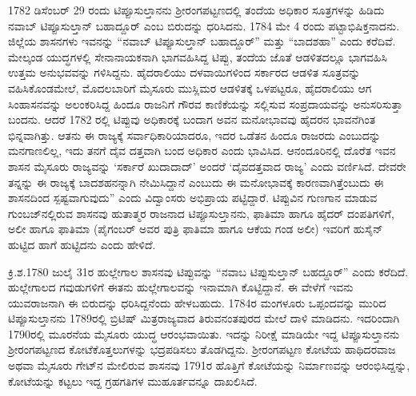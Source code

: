 1782 ಡಿಸೆಂಬರ್​ 29 ರಂದು ಟಿಪ್ಪೂಸುಲ್ತಾನನು ಶ‍್ರೀರಂಗಪಟ್ಟಣದಲ್ಲಿ ತಂದೆಯ ಅಧಿಕಾರ ಸೂತ್ರಗಳನ್ನು ಹಿಡಿದು ನವಾಬ್​ ಟಿಪ್ಪೂಸುಲ್ತಾನ್​ ಬಹಾದ್ದೂರ್​ ಎಂಬ ಬಿರುದನ್ನು ಧರಿಸಿದನು. 1784 ಮೇ 4 ರಂದು ಪಟ್ಟಾಭಿಷಿಕ್ತನಾದನು. ಜಿಲ್ಲೆಯ ಶಾಸನಗಳು ಇವನನ್ನು “ನವಾಬ್​ ಟಿಪ್ಪೂಸುಲ್ತಾನ್​ ಬಹಾದ್ದೂರ್​” ಮತ್ತು “ಬಾದಶಹಾ” ಎಂದು ಕರೆದಿವೆ. ಮೇಲ್ಕಂಡ ಯುದ್ಧಗಳಲ್ಲಿ ಸೇನಾನಾಯಕನಾಗಿ ಭಾಗವಹಿಸಿದ್ದ ಟಿಪ್ಪು, ತಂದೆಯ ಜೊತೆ ಆಡಳಿತದಲ್ಲೂ ಭಾಗವಹಿಸಿ ಉತ್ತಮ ಅನುಭವವನ್ನು ಗಳಿಸಿದ್ದನು. ಹೈದರಾಲಿಯು ದಳವಾಯಿಗಳಿಂದ ಸರ್ಕಾರದ ಆಡಳಿತ ಸೂತ್ರವನ್ನು ವಹಿಸಿಕೊಂಡಮೇಲೆ, ಮೊದಲಬಾರಿಗೆ ಮೈಸೂರು ಮುಸ್ಲಿಮರ ಆಡಳಿತಕ್ಕೆ ಒಳಪಟ್ಟರೂ, ಹೈದರಾಲಿಯು ಆಗ ಸಿಂಹಾಸನವನ್ನು ಅಲಂಕರಿಸಿದ್ದ ಹಿಂದೂ ರಾಜನಿಗೆ ಗೌರವ ಕಾಣಿಕೆಯನ್ನು ಸಲ್ಲಿಸುವ ಸಂಪ್ರದಾಯವನ್ನು ಅನುಸರಿಸುತ್ತಾ ಬಂದನು. ಆದರೆ 1782 ರಲ್ಲಿ ಟಿಪ್ಪುವು ಅಧಿಕಾರಕ್ಕೆ ಬಂದಾಗ ಅವನ ಮನೋಭಾವವು ಹೈದರನ ಭಾವನೆಗಿಂತ ಭಿನ್ನವಾಗಿತ್ತು. ಆತನು ಈ ರಾಜ್ಯಕ್ಕೆ ಸರ್ವಾಧಿಕಾರಿಯಾದರೂ, ಇದರ ಒಡೆತನ ಹಿಂದೂ ರಾಜರದು ಎಂಬುದನ್ನು ಮನಗಾಣಲಿಲ್ಲ, ಇದು ತನಗೆ ದೈವ ದತ್ತವಾಗಿ ಬಂದ ಅಧಿಕಾರ ಎಂದು ಭಾವಿಸಿದ. ಆನಂದೂರಿನಲ್ಲಿ ದೊರೆತ ಇವನ ಶಾಸನ ಮೈಸೂರು ರಾಜ್ಯವನ್ನು ‘ಸರ್ಕಾರೆ ಖುದಾದಾದ್​’ ಅಂದರೆ ‘ದೈವದತ್ತವಾದ ರಾಜ್ಯ’ ಎಂದು ವರ್ಣಿಸಿದೆ. ದೇವರೇ ತನ್ನನ್ನು ಈ ರಾಜ್ಯಕ್ಕೆ ಬಾದಶಹನನ್ನಾಗಿ ನೇಮಿಸಿದ್ದಾನೆ ಎಂಬುದು ಈ ಮನೋಭಾವಕ್ಕೆ ಕಾರಣವಾಗಿತ್ತೆಂಬುದು ಈ ಶಾಸನದಿಂದ ಸ್ಪಷ್ಟವಾಗುವುದು” ಎಂದು ವಿದ್ವಾಂಸರು ಅಭಿಪ್ರಾಯ ಪಟ್ಟಿದ್ದಾರೆ. ಟಿಪ್ಪುವಿನ ಗುಣಗಾನ ಮಾಡುವ ಗುಂಬಜ್​ನಲ್ಲಿರುವ ಶಾಸನವು ಹುತಾತ್ಮರ ರಾಜನಾದ ಟಿಪ್ಪೂಸುಲ್ತಾನನು, ಫಾತಿಮಾ ಹಾಗೂ ಹೈದರ್​ ದಂಪತಿಗಳಿಗೆ, ಅಲೀ ಹಾಗೂ ಫಾತಿಮಾ (ಪೈಗಂಬರ್​ ಅವರ ಪುತ್ರಿ ಫಾತಿಮಾ ಹಾಗೂ ಆಕೆಯ ಗಂಡ ಅಲೀ) ಇವರಿಗೆ ಹುಸೈನ್​ ಹುಟ್ಟಿದ ಹಾಗೆ ಹುಟ್ಟಿದನು ಎಂದು ಹೇಳಿದೆ.

ಕ್ರಿ.ಶ.1780 ಜುಲೈ 31ರ ಹುಲ್ಲೇಗಾಲ ಶಾಸನವು ಟಿಪ್ಪುವನ್ನು “ನವಾಬ ಟಿಪ್ಪುಸುಲ್ತಾನ್​ ಬಹದ್ದೂರ್​” ಎಂದು ಕರೆದಿದೆ. ಹುಲ್ಲೇಗಾಲದ ಗವುಡುಗಳಿಗೆ ಈತನು ಹುಲ್ಲೇಗಾಲವನ್ನು ಇನಾಮಾಗಿ ಕೊಟ್ಟಿದ್ದಾನೆ. ಈ ವೇಳೆಗೆ ಇವನು ಯುವರಾಜನಾಗಿ ಈ ಬಿರುದನ್ನು ಧರಿಸಿದ್ದನೆಂದು ಹೇಳಬಹುದು. 1784ರ ಮಂಗಳೂರು ಒಪ್ಪಂದವನ್ನು ಮುರಿದ ಟಿಪ್ಪೂಸುಲ್ತಾನನು 1789ರಲ್ಲಿ ಬ್ರಿಟಿಷ್​ ಮಿತ್ರರಾಜ್ಯವಾದ ತಿರುವನಂತಪುರದ ಮೇಲೆ ದಾಳಿ ಮಾಡಿದನು. ಇದರಿಂದಾಗಿ 1790ರಲ್ಲಿ ಮೂರನೆಯ ಮೈಸೂರು ಯುದ್ಧ ಆರಂಭವಾಯಿತು. ಇದನ್ನು ನಿರೀಕ್ಷೆ ಮಾಡಿಯೇ ಇದ್ದ ಟಿಪ್ಪೂಸುಲ್ತಾನನು ಶ‍್ರೀರಂಗಪಟ್ಟಣದ ಕೋಟೆಕೊತ್ತಲುಗಳನ್ನು ಭದ್ರಪಡಿಸಲು ತೊಡಗಿದ್ದನು. ಶ‍್ರೀರಂಗಪಟ್ಟಣ ಕೋಟೆಯ ಹಾಥಿದರವಾಜ ಅಥವಾ ಮೈಸೂರು ಗೇಟ್​ನ ಮೇಲಿರುವ ಶಾಸನವು 1791ರ ಹೊತ್ತಿಗೆ ಕೋಟೆಯನ್ನು ನಿರ್ಮಾಣವನ್ನು ಆರಂಭಿಸಿದ್ದನ್ನು, ಕೋಟೆಯನ್ನು ಕಟ್ಟಲು ಇದ್ದ ಗ್ರಹಗತಿಗಳ ಮುಹೂರ್ತ\-ವನ್ನೂ ದಾಖಲಿಸಿದೆ.

